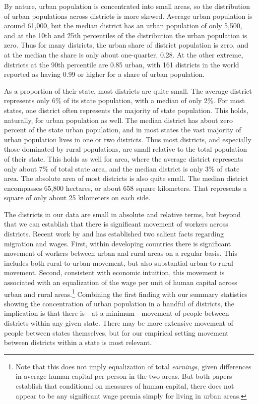 \documentclass[11pt]{article}
\begin{document}
By nature, urban population is concentrated into small areas, so the distribution of urban populations across districts is more skewed. Average urban population is around 61,000, but the median district has an urban population of only 5,500, and at the 10th and 25th percentiles of the distribution the urban population is zero. Thus for many districts, the urban share of district population is zero, and at the median the share is only about one-quarter, 0.28. At the other extreme, districts at the 90th percentile are 0.85 urban, with 161 districts in the world reported as having 0.99 or higher for a share of urban population. 

As a proportion of their state, most districts are quite small. The average district represents only 6\% of its state population, with a median of only 2\%. For most states, one district often represents the majority of state population. This holds, naturally, for urban population as well. The median district has about zero percent of the state urban population, and in most states the vast majority of urban population lives in one or two districts. Thus most districts, and especially those dominated by rural populations, are small relative to the total population of their state. This holds as well for area, where the average district represents only about 7\% of total state area, and the median district is only 3\% of state area. The absolute area of most districts is also quite small. The median district encompasses 65,800 hectares, or about 658 square kilometers. That represents a square of only about 25 kilometers on each side. 

The districts in our data are small in absolute and relative terms, but beyond that we can establish that there is significant movement of workers across districts. Recent work by \cite{young2013inequality} and \cite{hklm2017} has established two salient facts regarding migration and wages. First, within developing countries there is significant movement of workers between urban and rural areas on a regular basis. This includes both rural-to-urban movement, but also substantial urban-to-rural movement. Second, consistent with economic intuition, this movement is associated with an equalization of the wage per unit of human capital across urban and rural areas.\footnote{Note that this does not imply equalization of total \textit{earnings}, given differences in average human capital per person in the two areas. But both papers establish that conditional on measures of human capital, there does not appear to be any significant wage premia simply for living in urban areas.} Combining the first finding with our summary statistics showing the concentration of urban population in a handful of districts, the implication is that there is - at a minimum - movement of people between districts within any given state. There may be more extensive movement of people between states themselves, but for our empirical setting movement between districts within a state is most relevant.
\end{document}
